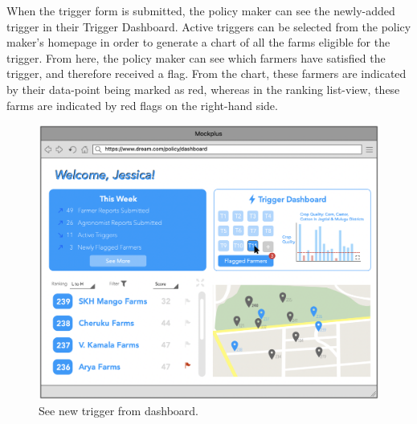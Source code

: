 \noindent
When the trigger form is submitted, the policy maker can see the newly-added trigger in their Trigger Dashboard. Active triggers can be selected from the policy maker's homepage in order to generate a chart of all the farms eligible for the trigger. From here, the policy maker can see which farmers have satisfied the trigger, and therefore received a flag. From the chart, these farmers are indicated by their data-point being marked as red, whereas in the ranking list-view, these farms are indicated by red flags on the right-hand side.


\begin{figure}[H]
\centering
\includegraphics[scale=0.35]{../images_diagrams/mock_ups/dd/Trig06_NewTrigAdded.png}
\caption{\label{fig:mockpolicy_trigEntered}See new trigger from dashboard.}
\end{figure}


